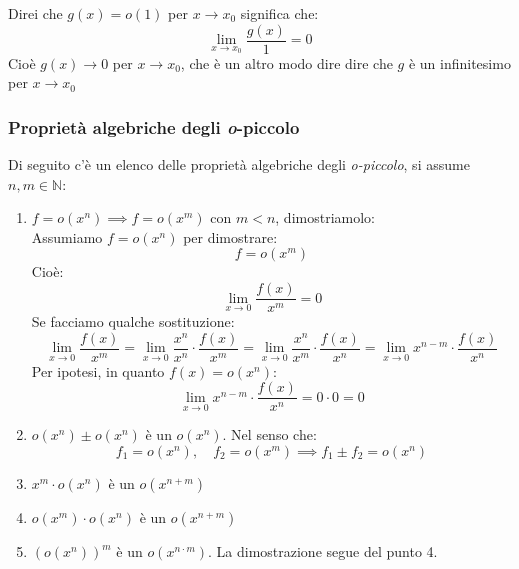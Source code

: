 Direi che $g(x) = o(1)$ per $x \to x_0$ significa che:
\begin{equation*}
	\lim_{x \to x_0} \dfrac{g(x)}{1} = 0
\end{equation*}
Cioè $g(x) \to 0$ per $x \to x_0$, che è un altro modo dire dire che $g$ è un infinitesimo per $x \to x_0$

\subsubsection{Proprietà algebriche degli \textit{o}-piccolo}
Di seguito c'è un elenco delle proprietà algebriche degli \textit{o-piccolo}, si assume $n, m \in \mathbb{N}$:
\begin{enumerate}
	\item $f = o(x^n) \implies f= o(x^m)$ con $m < n$, dimostriamolo:\\

		Assumiamo $f = o(x^n)$ per dimostrare:
		\begin{equation*}
			f = o(x^m)
		\end{equation*}
		Cioè:
		\begin{equation*}
			\lim_{x \to 0} \dfrac{f(x)}{x^m} = 0
		\end{equation*}
		Se facciamo qualche sostituzione:
		\begin{equation*}
			\lim_{x \to 0} \dfrac{f(x)}{x^m} = \lim_{x \to 0} \dfrac{x^n}{x^n} \cdot \dfrac{f(x)}{x^m} = \lim_{x \to 0} \dfrac{x^n}{x^m} \cdot \dfrac{f(x)}{x^n} = \lim_{x \to 0} x^{n-m} \cdot \dfrac{f(x)}{x^n}
		\end{equation*}
		Per ipotesi, in quanto $f(x) = o(x^n)$:
		\begin{equation*}
			\lim_{x \to 0} x^{n-m} \cdot \dfrac{f(x)}{x^n} = 0 \cdot 0 = 0
		\end{equation*}

	\item $o(x^n) \pm o(x^n)$ è un $o(x^n)$. Nel senso che:
		\begin{equation*}
			f_1 = o(x^n), \quad f_2 = o(x^m) \implies f_1 \pm f_2 = o(x^n)
		\end{equation*}

	\item $x^m \cdot o(x^n)$ è un $o(x^{n+m})$

	\item $o(x^m) \cdot o(x^n)$ è un $o(x^{n+m})$

	\item $(o(x^n))^m$ è un $o(x^{n \cdot m})$. La dimostrazione segue del punto 4.


\end{enumerate}
